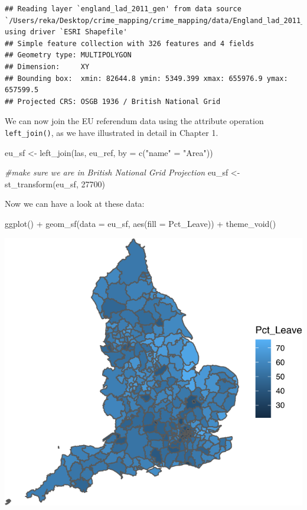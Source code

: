 \documentclass[
]{book}
\newenvironment{Shaded}{\begin{snugshade}}{\end{snugshade}}
\newcommand{\AttributeTok}[1]{\textcolor[rgb]{0.77,0.63,0.00}{#1}}
\newcommand{\CommentTok}[1]{\textcolor[rgb]{0.56,0.35,0.01}{\textit{#1}}}
\newcommand{\DecValTok}[1]{\textcolor[rgb]{0.00,0.00,0.81}{#1}}
\newcommand{\FunctionTok}[1]{\textcolor[rgb]{0.00,0.00,0.00}{#1}}
\newcommand{\NormalTok}[1]{#1}
\newcommand{\OtherTok}[1]{\textcolor[rgb]{0.56,0.35,0.01}{#1}}
\newcommand{\SpecialCharTok}[1]{\textcolor[rgb]{0.00,0.00,0.00}{#1}}
\newcommand{\StringTok}[1]{\textcolor[rgb]{0.31,0.60,0.02}{#1}}
\begin{document}
\begin{verbatim}
## Reading layer `england_lad_2011_gen' from data source `/Users/reka/Desktop/crime_mapping/crime_mapping/data/England_lad_2011_gen/england_lad_2011_gen.shp' using driver `ESRI Shapefile'
## Simple feature collection with 326 features and 4 fields
## Geometry type: MULTIPOLYGON
## Dimension:     XY
## Bounding box:  xmin: 82644.8 ymin: 5349.399 xmax: 655976.9 ymax: 657599.5
## Projected CRS: OSGB 1936 / British National Grid
\end{verbatim}

We can now join the EU referendum data using the attribute operation \texttt{left\_join()}, as we have illustrated in detail in Chapter 1.

\begin{Shaded}
\begin{Highlighting}[]
\NormalTok{eu\_sf }\OtherTok{\textless{}{-}} \FunctionTok{left\_join}\NormalTok{(las, eu\_ref, }\AttributeTok{by =} \FunctionTok{c}\NormalTok{(}\StringTok{"name"} \OtherTok{=} \StringTok{"Area"}\NormalTok{))}

\CommentTok{\#make sure we are in British National Grid Projection}
\NormalTok{eu\_sf }\OtherTok{\textless{}{-}} \FunctionTok{st\_transform}\NormalTok{(eu\_sf, }\DecValTok{27700}\NormalTok{)}
\end{Highlighting}
\end{Shaded}

Now we can have a look at these data:

\begin{Shaded}
\begin{Highlighting}[]
\FunctionTok{ggplot}\NormalTok{() }\SpecialCharTok{+}
  \FunctionTok{geom\_sf}\NormalTok{(}\AttributeTok{data =}\NormalTok{ eu\_sf, }\FunctionTok{aes}\NormalTok{(}\AttributeTok{fill =}\NormalTok{ Pct\_Leave)) }\SpecialCharTok{+} 
  \FunctionTok{theme\_void}\NormalTok{()}
\end{Highlighting}
\end{Shaded}

\includegraphics{crime_mapping_files/figure-latex/unnamed-chunk-134-1.pdf}
\end{document}
